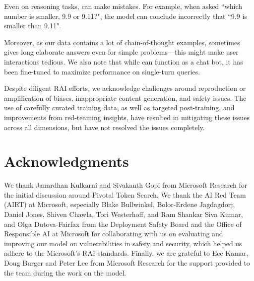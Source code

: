 Even on reasoning tasks, \model can make mistakes.  For example, when asked ``which number is smaller, 9.9 or 9.11?", the model can conclude incorrectly that ``9.9 is smaller than 9.11". 

Moreover, as our data contains a lot of chain-of-thought examples, \model sometimes gives long elaborate answers even for simple problems---this might make user interactions tedious. We also note that while \model can function as a chat bot, it has been fine-tuned to maximize performance on single-turn queries. 

Despite diligent RAI efforts, we acknowledge  challenges around  reproduction or amplification of biases, inappropriate content generation, and
safety issues. The use of carefully curated training data, as well as targeted post-training, and improvements
from red-teaming insights, have resulted in  mitigating these issues across all dimensions, but have not resolved the issues completely. 

\section*{Acknowledgments}
We thank Janardhan Kulkarni and Sivakanth Gopi from Microsoft Research for the initial discussion around Pivotal Token Search. We thank the AI Red Team (AIRT) at Microsoft, especially Blake Bullwinkel, Bolor-Erdene Jagdagdorj, Daniel Jones, Shiven Chawla, Tori Westerhoff, and Ram Shankar Siva Kumar, and Olga Dutova-Fairfax from the Deployment Safety Board and the Office of Responsible AI at Microsoft for collaborating with us on evaluating and improving our model on vulnerabilities in safety and security, which helped us adhere to the Microsoft's RAI standards. Finally, we are grateful to Ece Kamar, Doug Burger and Peter Lee from Microsoft Research for the support provided to the team during the work on the model.

